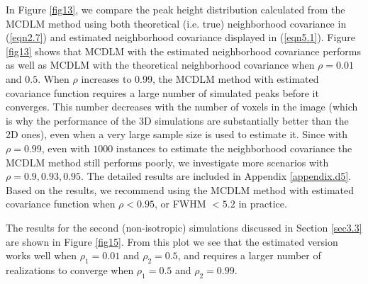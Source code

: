\documentclass{article}
\begin{document}
In Figure \ref{fig13}, we compare the peak height distribution calculated from the MCDLM method using both theoretical (i.e. true) neighborhood covariance in (\ref{eqn2.7}) and estimated neighborhood covariance displayed in (\ref{eqn5.1}). Figure \ref{fig13} shows that MCDLM with the estimated neighborhood covariance performs as well as MCDLM with the theoretical neighborhood covariance when $\rho = 0.01$ and $0.5$. When $\rho$ increases to 0.99, the MCDLM method with estimated covariance function requires a large number of simulated peaks before it converges. This number decreases with the number of voxels in the image (which is why the performance of the 3D simulations are substantially better than the 2D ones), even when a very large sample size is used to estimate it. Since with $\rho = 0.99$, even with $1000$ instances to estimate the neighborhood covariance the MCDLM method still performs poorly, we investigate more scenarios with $\rho = 0.9, 0.93, 0.95$. The detailed results are included in Appendix \ref{appendix.d5}. Based on the results, we recommend using the MCDLM method with estimated covariance function when $\rho < 0.95$, or FWHM $< 5.2$ in practice.

The results for the second (non-isotropic) simulations discussed in Section \ref{sec3.3} are shown in Figure \ref{fig15}. From this plot we see that the estimated version works well when $\rho_1 = 0.01$ and $\rho_2 = 0.5$, and requires a larger number of realizations to converge when $\rho_1 = 0.5$ and $\rho_2 = 0.99$.
\end{document}
